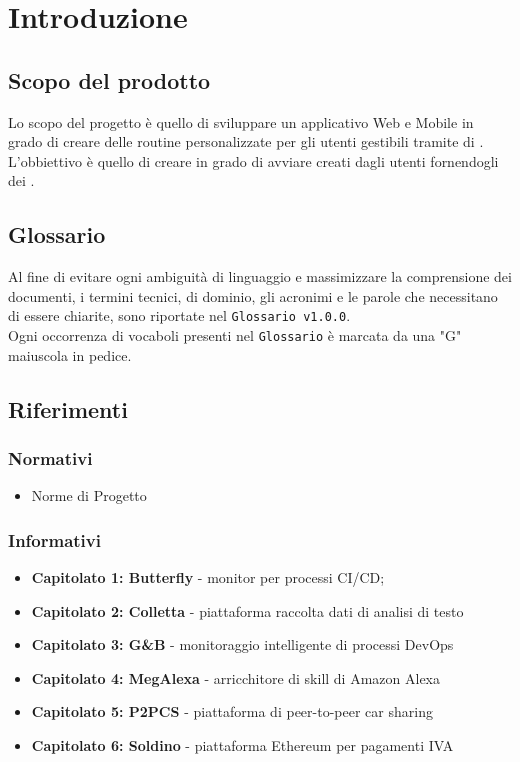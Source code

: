 \chapter{Introduzione}
\section{Scopo del prodotto}
Lo scopo del progetto è quello di sviluppare un applicativo Web e Mobile in grado di creare delle routine personalizzate per gli utenti gestibili tramite  di . L'obbiettivo è quello di creare  in grado di avviare  creati dagli utenti fornendogli dei .
\section{Glossario}
Al fine di evitare ogni ambiguità di linguaggio e massimizzare la comprensione dei documenti, i termini tecnici, di dominio, gli acronimi e le parole che necessitano di essere chiarite, sono riportate nel \texttt{Glossario v1.0.0}.\\
Ogni occorrenza di vocaboli presenti nel \texttt{Glossario} è marcata da una "G" maiuscola in pedice.
\section{Riferimenti}
\subsection{Normativi}
\begin{itemize}
	\item Norme di Progetto
\end{itemize}
\subsection{Informativi}
\begin{itemize}
\item \textbf{Capitolato 1: Butterfly} - monitor per processi CI/CD;
\item \textbf{Capitolato 2: Colletta} - piattaforma raccolta dati di analisi di testo
\item \textbf{Capitolato 3: G\&B} - monitoraggio intelligente di processi DevOps
\item \textbf{Capitolato 4: MegAlexa} - arricchitore di skill di Amazon Alexa
\item \textbf{Capitolato 5: P2PCS} - piattaforma di peer-to-peer car sharing
\item \textbf{Capitolato 6: Soldino} - piattaforma Ethereum per pagamenti IVA

\end{itemize}
